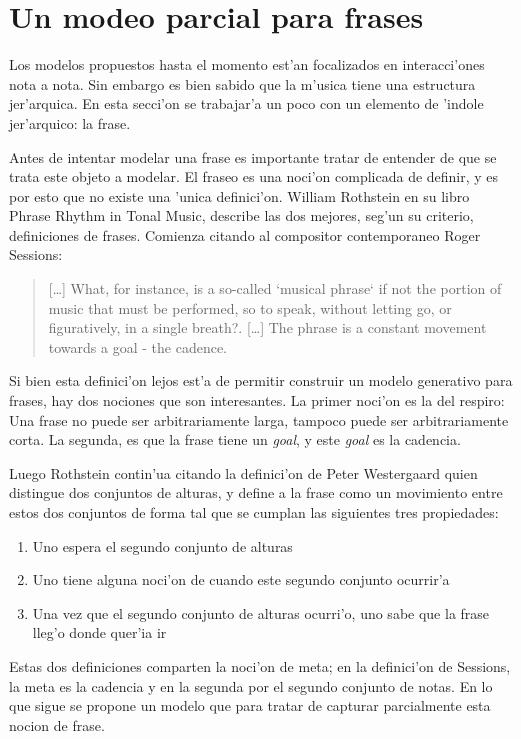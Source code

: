 \section{Un modeo parcial para frases}
\label{sec:phrases}
Los modelos propuestos hasta el momento est'an focalizados en interacci'ones nota a nota. Sin embargo es bien sabido que la m'usica
tiene una estructura jer'arquica. En esta secci'on se trabajar'a un poco con un elemento de 'indole jer'arquico: la frase. 

Antes de intentar modelar una frase es importante tratar de entender de que se trata este objeto a modelar. El fraseo es una
noci'on complicada de definir, y es por esto que no existe una 'unica definici'on. William Rothstein en su libro Phrase Rhythm 
in Tonal Music, describe las dos mejores, seg'un su criterio, definiciones de frases. Comienza citando al compositor contemporaneo
Roger Sessions: 

\begin{quote} 
[\ldots] What, for instance, is a so-called `musical phrase` if not the portion of music that must be performed, so to speak, 
without letting go, or figuratively, in a single breath?. [\ldots] The phrase is a constant movement towards a goal - the cadence.
\end{quote}

Si bien esta definici'on lejos est'a de permitir construir un modelo generativo para frases, hay dos nociones que son interesantes. 
La primer noci'on es la del respiro: Una frase no puede ser arbitrariamente larga, tampoco puede ser arbitrariamente corta. La 
segunda, es que la frase tiene un \emph{goal}, y este \emph{goal} es la cadencia.%

Luego Rothstein contin'ua citando la definici'on de Peter Westergaard quien distingue dos conjuntos de alturas, y define
a la frase como un movimiento entre estos dos conjuntos de forma tal que se cumplan las siguientes tres propiedades:
\begin{enumerate}
 \item Uno espera el segundo conjunto de alturas
 \item Uno tiene alguna noci'on de cuando este segundo conjunto ocurrir'a
 \item Una vez que el segundo conjunto de alturas ocurri'o, uno sabe que la frase lleg'o donde quer'ia ir
\end{enumerate}


Estas dos definiciones comparten la noci'on de meta; en la definici'on de Sessions, la meta es la cadencia y en la segunda
por el segundo conjunto de notas.  En lo que sigue se propone un modelo que para tratar de capturar parcialmente esta nocion de frase.

